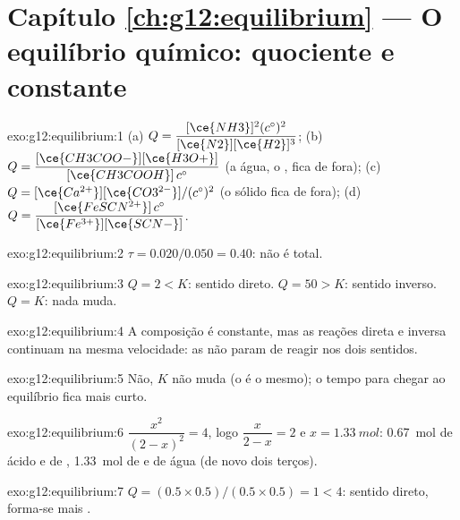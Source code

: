 \section*{Capítulo \ref{ch:g12:equilibrium} --- O equilíbrio químico: quociente e constante}

\begin{solution}{exo:g12:equilibrium:1}
(a) $Q = \dfrac{[\ce{NH3}]^2 (c^\circ)^2}{[\ce{N2}][\ce{H2}]^3}$;
(b) $Q = \dfrac{[\ce{CH3COO-}][\ce{H3O+}]}{[\ce{CH3COOH}]\,c^\circ}$ (a
água, o , fica de fora);
(c) $Q = [\ce{Ca^{2+}}][\ce{CO3^{2-}}]/(c^\circ)^2$ (o sólido fica de fora);
(d) $Q = \dfrac{[\ce{FeSCN^{2+}}]\,c^\circ}{[\ce{Fe^{3+}}][\ce{SCN-}]}$.
\end{solution}

\begin{solution}{exo:g12:equilibrium:2}
$\tau = 0.020/0.050 = 0.40$: não é total.
\end{solution}

\begin{solution}{exo:g12:equilibrium:3}
$Q = 2 < K$: sentido direto. $Q = 50 > K$: sentido inverso. $Q = K$: nada muda.
\end{solution}

\begin{solution}{exo:g12:equilibrium:4}
A composição é constante, mas as reações direta e inversa continuam na
mesma velocidade: as  não param de reagir nos dois sentidos.
\end{solution}

\begin{solution}{exo:g12:equilibrium:5}
Não, $K$ não muda (o  é o mesmo); o tempo para chegar ao
equilíbrio fica mais curto.
\end{solution}

\begin{solution}{exo:g12:equilibrium:6}
$\dfrac{x^2}{(2-x)^2} = 4$, logo $\dfrac{x}{2-x} = 2$ e
$x = \qty{1.33}{mol}$: \qty{0.67}{mol} de ácido e de ,
\qty{1.33}{mol} de  e de água (de novo dois terços).
\end{solution}

\begin{solution}{exo:g12:equilibrium:7}
$Q = (0.5 \times 0.5)/(0.5 \times 0.5) = 1 < 4$: sentido direto, forma-se
mais .
\end{solution}

